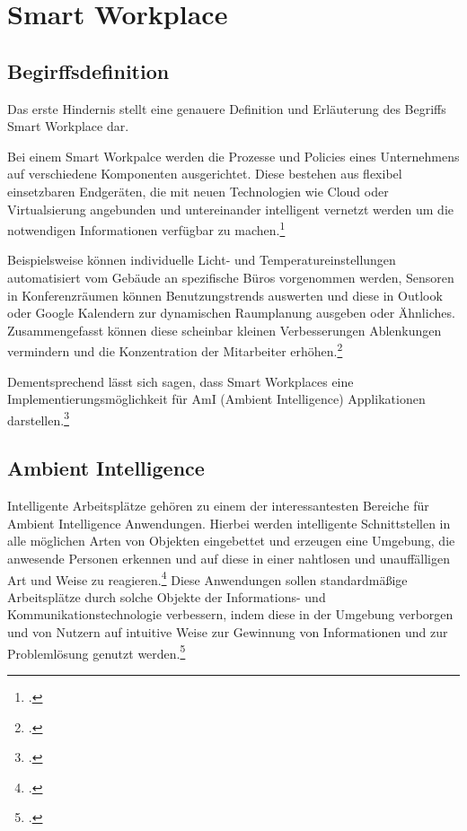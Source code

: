 \newpage
\section{Smart Workplace}
\subsection{Begirffsdefinition}
Das erste Hindernis stellt eine genauere Definition und Erläuterung des Begriffs Smart Workplace dar. 

Bei einem Smart Workpalce werden die Prozesse und Policies eines Unternehmens auf verschiedene Komponenten ausgerichtet. Diese bestehen aus flexibel einsetzbaren Endgeräten, die mit neuen Technologien wie Cloud oder Virtualsierung angebunden und untereinander intelligent vernetzt werden um die notwendigen Informationen verfügbar zu machen.\footcite[Vgl.][]{nextchange}

Beispielsweise können individuelle Licht- und Temperatureinstellungen automatisiert vom Gebäude an spezifische Büros vorgenommen werden, Sensoren in Konferenzräumen können Benutzungstrends auswerten und diese in Outlook oder Google Kalendern zur dynamischen Raumplanung ausgeben oder Ähnliches. Zusammengefasst können diese scheinbar kleinen Verbesserungen Ablenkungen vermindern und die Konzentration der Mitarbeiter erhöhen.\footcite[Vgl.][]{iotagenda}

Dementsprechend lässt sich sagen, dass Smart Workplaces eine Implementierungsmöglichkeit für AmI (Ambient Intelligence) Applikationen darstellen.\footcite[Vgl.][Seite 401]{leseprobe}

\subsection{Ambient Intelligence}
Intelligente Arbeitsplätze gehören zu einem der interessantesten Bereiche für Ambient Intelligence Anwendungen. 
Hierbei werden intelligente Schnittstellen in alle möglichen Arten von Objekten eingebettet und erzeugen eine Umgebung, die anwesende Personen erkennen und auf diese in einer nahtlosen und unauffälligen Art und Weise zu reagieren.\footcite[Vgl.][Seite 1]{istag} Diese Anwendungen sollen standardmäßige Arbeitsplätze durch solche Objekte der Informations- und Kommunikationstechnologie verbessern, indem diese in der Umgebung verborgen und von Nutzern auf intuitive Weise zur Gewinnung von Informationen und zur Problemlösung genutzt werden.\footcite[Vgl.][Seite 401]{leseprobe}

